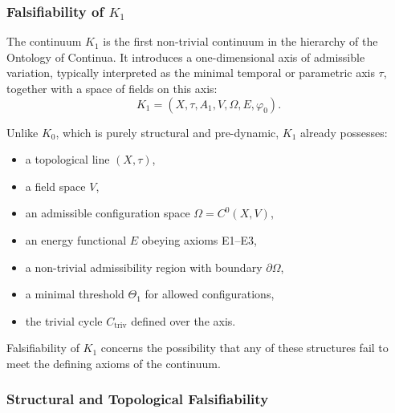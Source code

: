 
\subsubsection{Falsifiability of \texorpdfstring{$K_1$}{K_1}}
\label{sec:falsifiability-k1}

The continuum $K_1$ is the first non-trivial continuum in the hierarchy
of the Ontology of Continua.
It introduces a one-dimensional axis of admissible variation,
typically interpreted as the minimal temporal or parametric axis $\tau$,
together with a space of fields on this axis:
\[
K_1 = (X,\tau, A_1, V, \Omega, E, \varphi_0).
\]

Unlike $K_0$, which is purely structural and pre-dynamic, $K_1$ already
possesses:
\begin{itemize}
    \item a topological line $(X,\tau)$,
    \item a field space $V$,
    \item an admissible configuration space $\Omega=C^{0}(X,V)$,
    \item an energy functional $E$ obeying axioms E1–E3,
    \item a non-trivial admissibility region with boundary $\partial\Omega$,
    \item a minimal threshold $\Theta_1$ for allowed configurations,
    \item the trivial cycle $C_{\mathrm{triv}}$ defined over the axis.
\end{itemize}

Falsifiability of $K_1$ concerns the possibility that any of these
structures fail to meet the defining axioms of the continuum.



\subsubsection{Structural and Topological Falsifiability}

